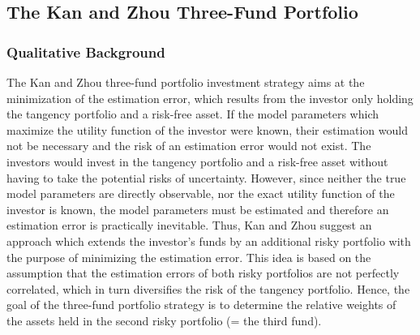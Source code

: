 \documentclass{article}
\begin{document}
\subsection{The Kan and Zhou Three-Fund Portfolio}
\subsubsection{Qualitative Background}
The Kan and Zhou three-fund portfolio investment strategy aims at the minimization of the estimation error, which results from the investor only holding the tangency portfolio and a risk-free asset. If the model parameters which maximize the utility function of the investor were known, their estimation would not be necessary and the risk of an estimation error would not exist. The investors would invest in the tangency portfolio and a risk-free asset without having to take the potential risks of uncertainty. However, since neither the true model parameters are directly observable, nor the exact utility function of the investor is known, the model parameters must be estimated and therefore an estimation error is practically inevitable. Thus, Kan and Zhou\cite{RAM07} suggest an approach which extends the investor's funds by an additional risky portfolio with the purpose of minimizing the estimation error. This idea is based on the assumption that the estimation errors of both risky portfolios are not perfectly correlated, which in turn diversifies the risk of the tangency portfolio. Hence, the goal of the three-fund portfolio strategy is to determine the relative weights of the assets held in the second risky portfolio (= the third fund). 
\end{document}
